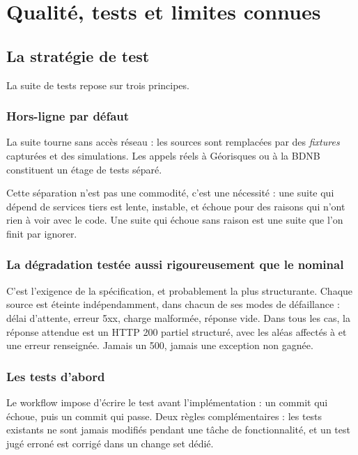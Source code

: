 \chapter{Qualité, tests et limites connues}
\label{ch:qualite}

\section{La stratégie de test}

La suite de tests repose sur trois principes.

\subsection{Hors-ligne par défaut}

La suite tourne sans accès réseau : les sources sont remplacées par des
\emph{fixtures} capturées et des simulations. Les appels réels à Géorisques ou
à la BDNB constituent un étage de tests séparé.

Cette séparation n'est pas une commodité, c'est une nécessité : une suite qui
dépend de services tiers est lente, instable, et échoue pour des raisons qui
n'ont rien à voir avec le code. Une suite qui échoue sans raison est une suite
que l'on finit par ignorer.

\subsection{La dégradation testée aussi rigoureusement que le nominal}

C'est l'exigence  de la spécification, et probablement la plus
structurante. Chaque source est éteinte indépendamment, dans chacun de ses
modes de défaillance : délai d'attente, erreur 5xx, charge malformée, réponse
vide. Dans tous les cas, la réponse attendue est un HTTP 200 partiel structuré,
avec les aléas affectés à  et une erreur renseignée. Jamais
un 500, jamais une exception non gagnée.

\subsection{Les tests d'abord}

Le workflow impose d'écrire le test avant l'implémentation : un commit
 qui échoue, puis un commit  qui passe. Deux
règles complémentaires : les tests existants ne sont jamais modifiés pendant une
tâche de fonctionnalité, et un test jugé erroné est corrigé dans un change set
dédié.

